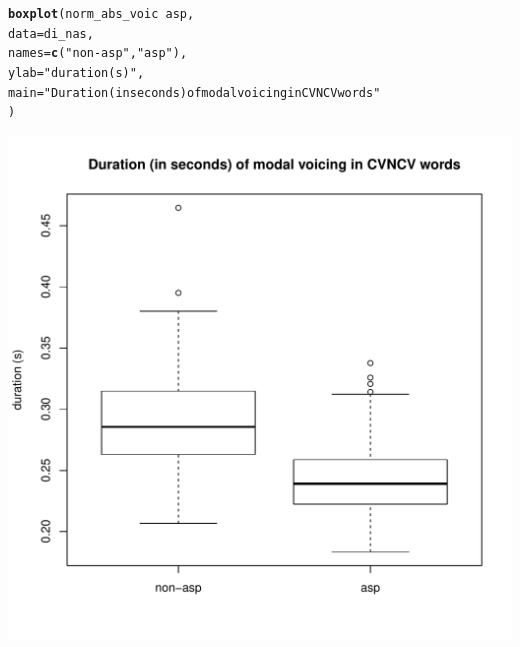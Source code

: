\documentclass[a4paper,11pt]{article}\usepackage[]{graphicx}\usepackage[]{color}
\makeatletter
\def\maxwidth{ %
  \ifdim\Gin@nat@width>\linewidth
    \linewidth
  \else
    \Gin@nat@width
  \fi
}
\newcommand{\hlstr}[1]{\textcolor[rgb]{0.192,0.494,0.8}{#1}}%
\newcommand{\hlopt}[1]{\textcolor[rgb]{0,0,0}{#1}}%
\newcommand{\hlstd}[1]{\textcolor[rgb]{0.345,0.345,0.345}{#1}}%
\newcommand{\hlkwc}[1]{\textcolor[rgb]{0.333,0.667,0.333}{#1}}%
\newcommand{\hlkwd}[1]{\textcolor[rgb]{0.737,0.353,0.396}{\textbf{#1}}}%
\newenvironment{kframe}{%
 \def\at@end@of@kframe{}%
 \ifinner\ifhmode%
  \def\at@end@of@kframe{\end{minipage}}%
  \begin{minipage}{\columnwidth}%
 \fi\fi%
 \def\FrameCommand##1{\hskip\@totalleftmargin \hskip-\fboxsep
 \colorbox{shadecolor}{##1}\hskip-\fboxsep
     \hskip-\linewidth \hskip-\@totalleftmargin \hskip\columnwidth}%
 \MakeFramed {\advance\hsize-\width
   \@totalleftmargin\z@ \linewidth\hsize
   \@setminipage}}%
 {\par\unskip\endMakeFramed%
 \at@end@of@kframe}
\newenvironment{knitrout}{}{} %
\makeatother
\begin{document}
\begin{knitrout}
\end{knitrout}

\begin{knitrout}
\color{fgcolor}\begin{kframe}
\begin{alltt}
\hlkwd{boxplot}\hlstd{(norm_abs_voic} \hlopt{~} \hlstd{asp,}
        \hlkwc{data} \hlstd{= di_nas,}
        \hlkwc{names} \hlstd{=} \hlkwd{c}\hlstd{(}\hlstr{"non-asp"}\hlstd{,} \hlstr{"asp"}\hlstd{),}
        \hlkwc{ylab} \hlstd{=} \hlstr{"duration (s)"}\hlstd{,}
        \hlkwc{main} \hlstd{=} \hlstr{"Duration (in seconds) of modal voicing in CVNCV words"}
        \hlstd{)}
\end{alltt}
\end{kframe}
\includegraphics[width=\maxwidth]{img/bi-nas-box-1} 

\end{knitrout}
\end{document}
